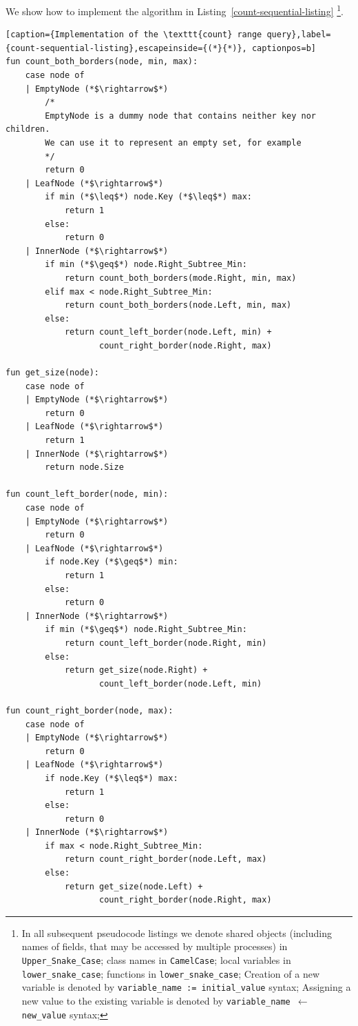 \documentclass[times, dvipsnames,%
               languages={russian,english} %
              ]{itmo-student-thesis}
\begin{document}
\bigbreak

We show how to implement the algorithm in Listing~\ref{count-sequential-listing} \footnote{In all subsequent pseudocode listings we denote shared objects (including names of fields, that may be accessed by multiple processes) in \texttt{Upper\_Snake\_Case}; class names in \texttt{CamelCase}; local variables in \texttt{lower\_snake\_case}; functions in \texttt{lower\_snake\_case}; Creation of a new variable is denoted by \texttt{variable\_name := initial\_value} syntax; Assigning a new value to the existing variable is denoted by \texttt{variable\_name $\leftarrow$ new\_value} syntax;}.

\renewcommand{\lstlistingname}{Listing}
\begin{lstlisting}[caption={Implementation of the \texttt{count} range query},label={count-sequential-listing},escapeinside={(*}{*)}, captionpos=b]
fun count_both_borders(node, min, max):
    case node of
    | EmptyNode (*$\rightarrow$*)
        /* 
        EmptyNode is a dummy node that contains neither key nor children.
        We can use it to represent an empty set, for example
        */
        return 0
    | LeafNode (*$\rightarrow$*)
        if min (*$\leq$*) node.Key (*$\leq$*) max:
            return 1
        else:
            return 0
    | InnerNode (*$\rightarrow$*)
        if min (*$\geq$*) node.Right_Subtree_Min:
            return count_both_borders(mode.Right, min, max)
        elif max < node.Right_Subtree_Min:
            return count_both_borders(node.Left, min, max)
        else:
            return count_left_border(node.Left, min) +
                   count_right_border(node.Right, max)
    
fun get_size(node):
    case node of
    | EmptyNode (*$\rightarrow$*)
        return 0    
    | LeafNode (*$\rightarrow$*)
        return 1
    | InnerNode (*$\rightarrow$*)
        return node.Size   
                   
fun count_left_border(node, min):
    case node of
    | EmptyNode (*$\rightarrow$*)
        return 0
    | LeafNode (*$\rightarrow$*)
        if node.Key (*$\geq$*) min:
            return 1
        else:
            return 0
    | InnerNode (*$\rightarrow$*)
        if min (*$\geq$*) node.Right_Subtree_Min:
            return count_left_border(node.Right, min)
        else:
            return get_size(node.Right) + 
                   count_left_border(node.Left, min)
            
fun count_right_border(node, max):
    case node of
    | EmptyNode (*$\rightarrow$*)
        return 0
    | LeafNode (*$\rightarrow$*)
        if node.Key (*$\leq$*) max:
            return 1
        else:
            return 0
    | InnerNode (*$\rightarrow$*)
        if max < node.Right_Subtree_Min:
            return count_right_border(node.Left, max)
        else:
            return get_size(node.Left) + 
                   count_right_border(node.Right, max)
\end{lstlisting}
\end{document}

